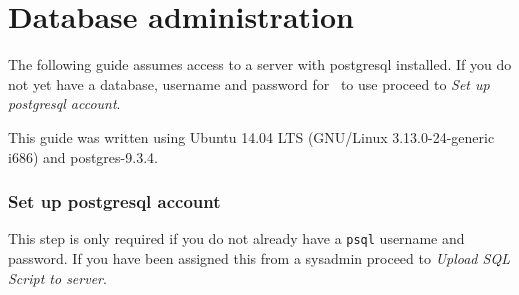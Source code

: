 \section{Database administration}
The following guide assumes access to a server with postgresql installed. If you do not yet have a database, username and password for \appName\ to use proceed to \emph{Set up postgresql account}.

    This guide was written using Ubuntu 14.04 LTS (GNU/Linux 3.13.0-24-generic i686) and postgres-9.3.4.

    \subsubsection{Set up postgresql account}
      This step is only required if you do not already have a \texttt{psql} username and password. If you have been assigned this from a sysadmin proceed to \emph{Upload SQL Script to server}.

